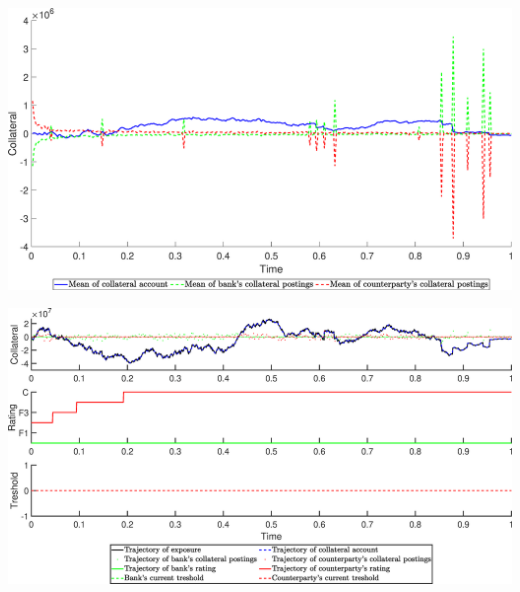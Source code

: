 \begin{landscape}
\includegraphics[width=.95\columnwidth]{CollateralPC/CollateralPC_FOBB_1}
\end{landscape}
\begin{landscape}
\includegraphics[width=.95\columnwidth]{CollateralPC/CollateralPC_FOBB_2}
\end{landscape}
